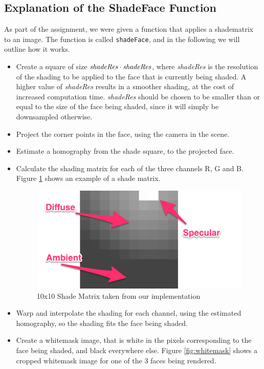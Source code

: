 \documentclass[a4paper,11pt]{article}
\begin{document}
\subsection{Explanation of the ShadeFace Function}
As part of the assignment, we were given a function that applies a shadematrix to an image. The function is called \texttt{shadeFace}, and in the following we will outline how it works.

\begin{itemize}
\item Create a square of size $\emph{shadeRes} \cdot \emph{shadeRes}$, where \emph{shadeRes} is the resolution of the shading to be applied to the face that is currently being shaded. A higher value of \emph{shadeRes} results in a smoother shading, at the cost of increased computation time. \emph{shadeRes} should be chosen to be smaller than or equal to the size of the face being shaded, since it will simply be downsampled otherwise.

\item Project the corner points in the face, using the camera in the scene.

\item Estimate a homography from the shade square, to the projected face.

\item Calculate the shading matrix for each of the three channels R, G and B. Figure \ref{fig:shade_matrix} shows an example of a shade matrix.

\begin{figure}[H]
  \centering
  \includegraphics[width=0.5\linewidth]{shade_explained}
  \caption{10x10 Shade Matrix taken from our implementation}
  \label{fig:shade_matrix}
\end{figure}

\item Warp and interpolate the shading for each channel, using the estimated homography, so the shading fits the face being shaded.

\item Create a whitemask image, that is white in the pixels corresponding to the face being shaded, and black everywhere else. Figure \ref{fig:whitemask} shows a cropped whitemask image for one of the 3 faces being rendered.


\end{itemize}
\end{document}

